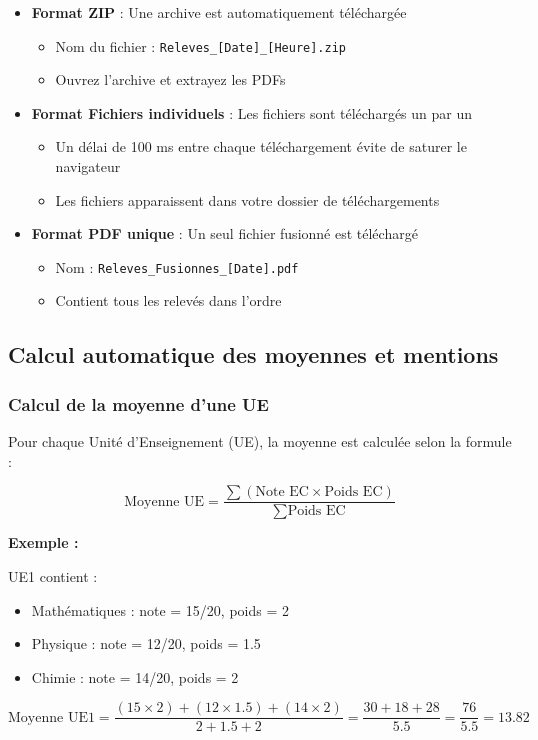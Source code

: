 \begin{itemize}[leftmargin=*]
    \item \textbf{Format ZIP} : Une archive est automatiquement téléchargée
    \begin{itemize}
        \item Nom du fichier : \texttt{Releves\_[Date]\_[Heure].zip}
        \item Ouvrez l'archive et extrayez les PDFs
    \end{itemize}

    \item \textbf{Format Fichiers individuels} : Les fichiers sont téléchargés un par un
    \begin{itemize}
        \item Un délai de 100 ms entre chaque téléchargement évite de saturer le navigateur
        \item Les fichiers apparaissent dans votre dossier de téléchargements
    \end{itemize}

    \item \textbf{Format PDF unique} : Un seul fichier fusionné est téléchargé
    \begin{itemize}
        \item Nom : \texttt{Releves\_Fusionnes\_[Date].pdf}
        \item Contient tous les relevés dans l'ordre
    \end{itemize}
\end{itemize}

\subsection{Calcul automatique des moyennes et mentions}

\subsubsection{Calcul de la moyenne d'une UE}

Pour chaque Unité d'Enseignement (UE), la moyenne est calculée selon la formule :

\begin{tcolorbox}[colback=green!5!white,colframe=green!75!black,title=Formule de calcul]
$$\text{Moyenne UE} = \frac{\sum (\text{Note EC} \times \text{Poids EC})}{\sum \text{Poids EC}}$$

\textbf{Exemple :}

UE1 contient :
\begin{itemize}
    \item Mathématiques : note = 15/20, poids = 2
    \item Physique : note = 12/20, poids = 1.5
    \item Chimie : note = 14/20, poids = 2
\end{itemize}

$$\text{Moyenne UE1} = \frac{(15 \times 2) + (12 \times 1.5) + (14 \times 2)}{2 + 1.5 + 2} = \frac{30 + 18 + 28}{5.5} = \frac{76}{5.5} = 13.82$$
\end{tcolorbox}

